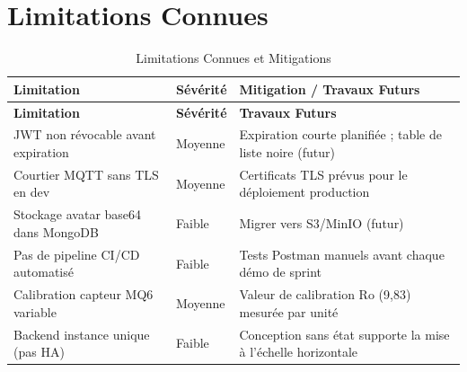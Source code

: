\section{Limitations Connues}

\begin{center}
\begin{longtable}{p{} p{} p{}}
\caption{Limitations Connues et Mitigations}\label{tab:limitations}\\
\toprule
\textbf{Limitation} & \textbf{Sévérité} & \textbf{Mitigation / Travaux Futurs} \\
\midrule
\endfirsthead
\toprule
\textbf{Limitation} & \textbf{Sévérité} & \textbf{Travaux Futurs} \\
\midrule
\endhead
\bottomrule
\endfoot
JWT non révocable avant expiration & Moyenne & Expiration courte planifiée ; table de liste noire (futur) \\
Courtier MQTT sans TLS en dev & Moyenne & Certificats TLS prévus pour le déploiement production \\
Stockage avatar base64 dans MongoDB & Faible & Migrer vers S3/MinIO (futur) \\
Pas de pipeline CI/CD automatisé & Faible & Tests Postman manuels avant chaque démo de sprint \\
Calibration capteur MQ6 variable & Moyenne & Valeur de calibration Ro (9,83) mesurée par unité \\
Backend instance unique (pas HA) & Faible & Conception sans état supporte la mise à l'échelle horizontale \\
\end{longtable}
\end{center}
